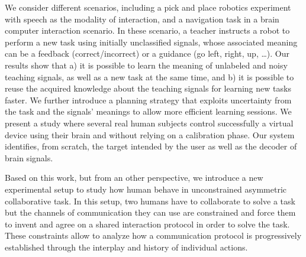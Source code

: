 \begin{vcenterpage}
We consider different scenarios, including a pick and place robotics experiment with speech as the modality of interaction, and a navigation task in a brain computer interaction scenario. In these scenario, a teacher instructs a robot to perform a new task using initially unclassified signals, whose associated meaning can be a feedback (correct/incorrect) or a guidance (go left, right, up, \ldots). Our results show that a) it is possible to learn the meaning of unlabeled and noisy teaching signals, as well as a new task at the same time, and b) it is possible to reuse the acquired knowledge about the teaching signals for learning new tasks faster. We further introduce a planning strategy that exploits uncertainty from the task and the signals' meanings to allow more efficient learning sessions. We present a study where several real human subjects control successfully a virtual device using their brain and without relying on a calibration phase. Our system identifies, from scratch, the target intended by the user as well as the decoder of brain signals.



Based on this work, but from an other perspective, we introduce a new experimental setup to study how human behave in unconstrained asymmetric collaborative task. In this setup, two humans have to collaborate to solve a task but the channels of communication they can use are constrained and force them to invent and agree on a shared interaction protocol in order to solve the task. These constraints allow to analyze how a communication protocol is progressively established through the interplay and history of individual actions.







\end{vcenterpage}